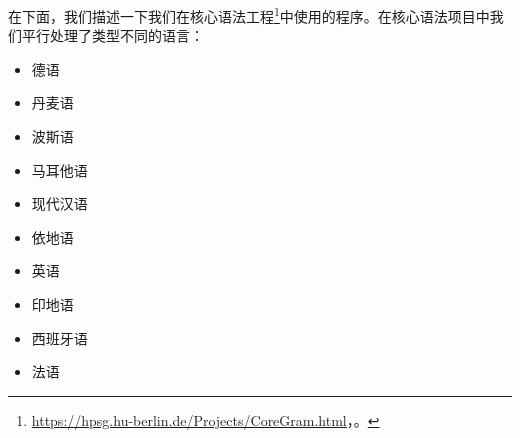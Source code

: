 在下面，我们描述一下我们在核心语法工程\footnote{%
\url{https://hpsg.hu-berlin.de/Projects/CoreGram.html}，\mytodayc。
}\citep{MuellerCoreGramBrief,MuellerCoreGram}中使用的程序。在核心语法项目中我们平行处理了类型不同的语言：
\begin{itemize}
\item 德语  \citep{MuellerLehrbuch1,MuellerPredication,MuellerCopula,MOe2011a,MOe2013a,MuellerArten,MuellerGS}\vspace{-\baselineskip}
\item 丹麦语  \citep{Oersnes2009a,MuellerPredication,MuellerCopula,MOe2011a,MOe2013a,MOe2013b,MOeDanish}\vspace{-\baselineskip}
\item 波斯语 \citep*{MuellerPersian,MG2010a}
\item 马耳他语 \citep{MuellerMalteseSketch}
\item 现代汉语 \citep{Lipenkova2009a,ML2009a,ML2013a,MLChinese}
\item 依地语 \citep{MOe2011a}
\item 英语 \citep{MuellerPredication,MuellerCopula,MOe2013a}
\item 印地语
\item 西班牙语 \citep{Machicao-y-Priemer2015a}
\item 法语
\end{itemize}

